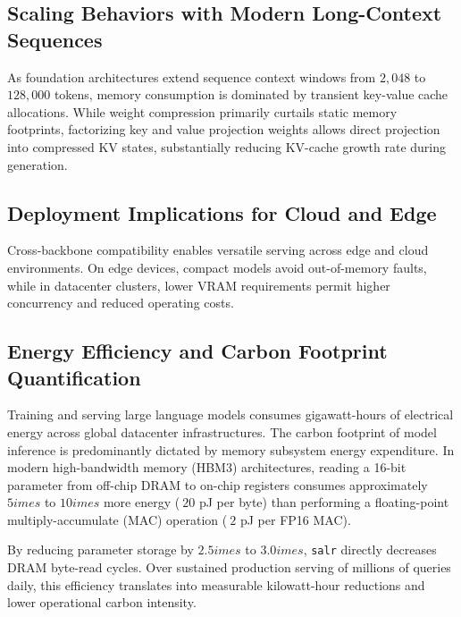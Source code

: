 \subsection{Scaling Behaviors with Modern Long-Context Sequences}
As foundation architectures extend sequence context windows from $2{,}048$ to $128{,}000$ tokens, memory consumption is dominated by transient key-value cache allocations. While weight compression primarily curtails static memory footprints, factorizing key and value projection weights allows direct projection into compressed KV states, substantially reducing KV-cache growth rate during generation.

\subsection{Deployment Implications for Cloud and Edge}
Cross-backbone compatibility enables versatile serving across edge and cloud environments. On edge devices, compact models avoid out-of-memory faults, while in datacenter clusters, lower VRAM requirements permit higher concurrency and reduced operating costs.

\subsection{Energy Efficiency and Carbon Footprint Quantification}
Training and serving large language models consumes gigawatt-hours of electrical energy across global datacenter infrastructures. The carbon footprint of model inference is predominantly dictated by memory subsystem energy expenditure. In modern high-bandwidth memory (HBM3) architectures, reading a 16-bit parameter from off-chip DRAM to on-chip registers consumes approximately $5	imes$ to $10	imes$ more energy ($~20$ pJ per byte) than performing a floating-point multiply-accumulate (MAC) operation ($~2$ pJ per FP16 MAC).

By reducing parameter storage by $2.5	imes$ to $3.0	imes$, \texttt{salr} directly decreases DRAM byte-read cycles. Over sustained production serving of millions of queries daily, this efficiency translates into measurable kilowatt-hour reductions and lower operational carbon intensity.
